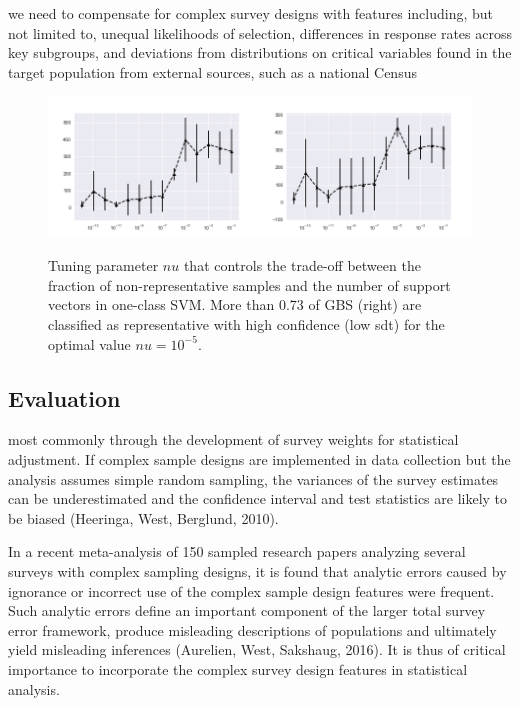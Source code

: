 we need to compensate for complex survey designs with features including, but not limited to, unequal likelihoods of selection, differences in response rates across key subgroups, and deviations from distributions on critical variables found in the target population from external sources, such as a national Census

\begin{figure}[ht]
	\begin{center}
		\includegraphics[scale=0.55,angle=0]{fig/occfigure}
		\label{occ}
		\vspace*{-1.0cm}
		\caption{Tuning parameter \(nu\) that controls the trade-off between the fraction of non-representative samples and the number of support vectors in one-class SVM. More than 0.73 of GBS (right) are classified as representative with high confidence (low sdt) for the optimal value \(nu = 10^{-5}\).}
	\end{center}
\end{figure}

\subsection{Evaluation}

most commonly through the development of survey weights for statistical adjustment. If complex sample designs are implemented in data collection but the analysis assumes simple random sampling, the variances of the survey estimates can be underestimated and the confidence interval and test statistics are likely to be biased (Heeringa, West,  Berglund, 2010).

In a recent meta-analysis of 150 sampled research papers analyzing several surveys with complex sampling designs, it is found that analytic errors caused by ignorance or incorrect use of the complex sample design features were frequent. Such analytic errors define an important component of the larger total survey error framework, produce misleading descriptions of populations and ultimately yield misleading inferences (Aurelien, West,  Sakshaug, 2016). It is thus of critical importance to incorporate the complex survey design features in statistical analysis. 


